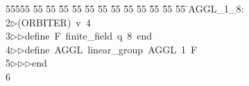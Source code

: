 %
%
\begin{tabbing}
55555 \= 55 \= 55 \= 55 \= 55 \= 55 \= 55 \= 55 \= 55 \= 55 \= 55 \= 55 \= 55 \= \>AGGL\_1\_8:\\[0pt]
2\>$\triangleright$\>(ORBITER)\ v\ 4\ \\[0pt]
3\>$\triangleright$\>$\triangleright$\>define\ F\ finite\_field\ q\ 8\ end\ \\[0pt]
4\>$\triangleright$\>$\triangleright$\>define\ AGGL\ linear\_group\ AGGL\ 1\ F\ \\[0pt]
5\>$\triangleright$\>$\triangleright$\>$\triangleright$\>end\\[0pt]
6\>\end{tabbing}
